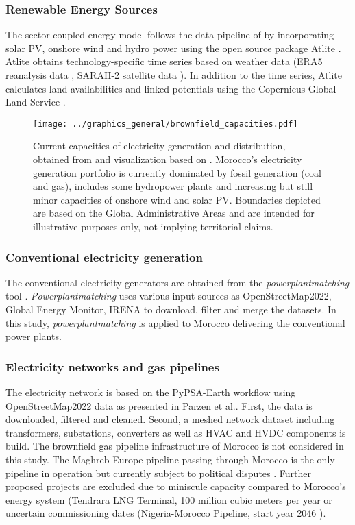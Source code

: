 \subsubsection*{Renewable Energy Sources}
The sector-coupled energy model follows the data pipeline of \cite{Parzen2023} by incorporating solar PV, onshore wind and hydro power using the open source package Atlite \cite{Hofmann2021}.
Atlite obtains technology-specific time series based on weather data (ERA5 reanalysis data \cite{Hersbach2020}, SARAH-2 satellite data \cite{Pfeifroth2017}). 
In addition to the time series, Atlite calculates land availabilities and linked potentials using the Copernicus Global Land Service \cite{Buchhorn2020}.


\begin{figure*}[t]
    \centering
    \texttt{[image: ../graphics\_general/brownfield\_capacities.pdf]}
    \caption{Current capacities of electricity generation and distribution, obtained from \cite{Parzen2022} and visualization based on \cite{Horsch2018}. Morocco's electricity generation portfolio is currently dominated by fossil generation (coal and gas), includes some hydropower plants and increasing but still minor capacities of onshore wind and solar PV. Boundaries depicted are based on the Global Administrative Areas and are intended for illustrative purposes only, not implying territorial claims.
    }
    \label{fig:MAR_brownfield}
\end{figure*}


\subsubsection*{Conventional electricity generation}
The conventional electricity generators are obtained from the \textit{powerplantmatching} tool \cite{Powerplantmatching2019}. \textit{Powerplantmatching} uses various input sources as OpenStreetMap2022, Global Energy Monitor, IRENA \cite{IRENA2022, OpenStreetMap2022, GlobalEnergyMonitor} to download, filter and merge the datasets. 
In this study, \textit{powerplantmatching} is applied to Morocco delivering the conventional power plants.

\subsubsection*{Electricity networks and gas pipelines}
The electricity network is based on the PyPSA-Earth workflow using OpenStreetMap2022 data \cite{OpenStreetMap2022} as presented in Parzen et al.\cite{Parzen2023}. First, the data is downloaded, filtered and cleaned. Second, a meshed network dataset including transformers, substations, converters as well as HVAC and HVDC components is build\cite{Parzen2023}. 
The brownfield gas pipeline infrastructure of Morocco is not considered in this study. The Maghreb-Europe pipeline passing through Morocco is the only pipeline in operation but currently subject to political disputes \cite{Rachidi2022}. Further proposed projects are excluded due to  miniscule capacity compared to Morocco's energy system (Tendrara LNG Terminal, 100 million cubic meters per year or uncertain commissioning dates (Nigeria-Morocco Pipeline, start year 2046 \cite{GEM2023b}).


